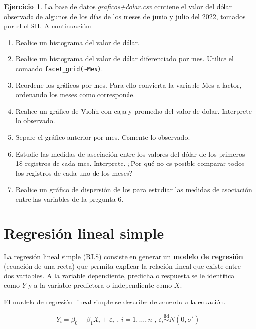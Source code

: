 \documentclass[
  11pt,
]{book}
\providecommand{\tightlist}{%
  \setlength{\itemsep}{0pt}\setlength{\parskip}{0pt}}
\theoremstyle{definition}
\theoremstyle{definition}
\theoremstyle{definition}
\newtheorem{exercise}{Ejercicio}[chapter]
\theoremstyle{definition}
\theoremstyle{remark}
\begin{document}
\begin{exercise}

La base de datos \href{https://raw.githubusercontent.com/Dfranzani/Bases-de-datos-para-cursos/main/2022-2/Estad\%C3\%ADstica\%202/dolar.csv}{\emph{graficos+dolar.csv}} contiene el valor del dólar observado de algunos de los días de los meses de junio y julio del 2022, tomados por el el SII. A continuación:

\begin{enumerate}
\def\labelenumi{\arabic{enumi}.}
\tightlist
\item
  Realice un histograma del valor de dólar.
\item
  Realice un histograma del valor de dólar diferenciado por mes. Utilice el comando \texttt{facet\_grid(\textasciitilde{}Mes)}.
\item
  Reordene los gráficos por mes. Para ello convierta la variable Mes a factor, ordenando los meses como corresponde.
\item
  Realice un gráfico de Violín con caja y promedio del valor de dolar. Interprete lo observado.
\item
  Separe el gráfico anterior por mes. Comente lo observado.
\item
  Estudie las medidas de asociación entre los valores del dólar de los primeros 18 registros de cada mes. Interprete. ¿Por qué no es posible comparar todos los registros de cada uno de los meses?
\item
  Realice un gráfico de dispersión de los para estudiar las medidas de asociación entre las variables de la pregunta 6.
\end{enumerate}

\end{exercise}

\section{Regresión lineal simple}\label{regresion-lineal-simple}

La regresión lineal simple (RLS) consiste en generar un \textbf{modelo de regresión} (ecuación de una recta) que permita explicar la relación lineal que existe entre dos variables. A la variable dependiente, predicha o respuesta se le identifica como \(Y\) y a la variable predictora o independiente como \(X\). \citep[página 450]{Devore}

El modelo de regresión lineal simple se describe de acuerdo a la ecuación:

\begin{equation}
Y_i = \beta_0 + \beta_1X_i + \varepsilon_i \text{ , }i = 1,\ldots ,n \text{ , } \varepsilon_i \overset{\text{iid}}{\sim} N(0,\sigma^2)
\label{eq:regresion}
\end{equation}
\end{document}
